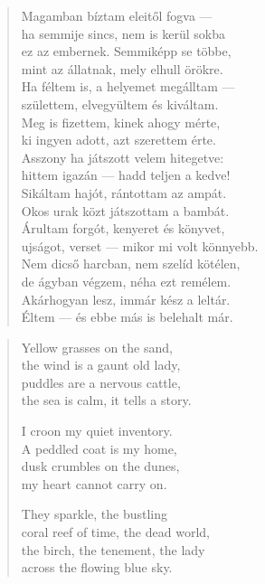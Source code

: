 \documentclass[11pt]{book}
\newcommand*{\centeredornament}{\centerline{\pgfornament[width=6cm]{88}}}
\begin{document}
\begin{verse}
  Magamban bíztam eleitől fogva --- \\
  ha semmije sincs, nem is kerül sokba \\
  ez az embernek. Semmiképp se többe, \\
  mint az állatnak, mely elhull örökre. \\
  Ha féltem is, a helyemet megálltam --- \\
  születtem, elvegyültem és kiváltam. \\
  Meg is fizettem, kinek ahogy mérte, \\
  ki ingyen adott, azt szerettem érte. \\
  Asszony ha játszott velem hitegetve: \\
  hittem igazán --- hadd teljen a kedve! \\
  Sikáltam hajót, rántottam az ampát. \\
  Okos urak közt játszottam a bambát. \\
  Árultam forgót, kenyeret és könyvet, \\
  ujságot, verset --- mikor mi volt könnyebb. \\
  Nem dicső harcban, nem szelíd kötélen, \\
  de ágyban végzem, néha ezt remélem. \\
  Akárhogyan lesz, immár kész a leltár. \\
  Éltem --- és ebbe más is belehalt már.
\end{verse}

\newpage

\vspace*{-15mm}
\centeredornament



\begin{verse}
  Yellow grasses on the sand, \\
  the wind is a gaunt old lady, \\
  puddles are a nervous cattle, \\
  the sea is calm, it tells a story.

  I croon my quiet inventory. \\
  A peddled coat is my home, \\
  dusk crumbles on the dunes, \\
  my heart cannot carry on.

  They sparkle, the bustling \\
  coral reef of time, the dead world, \\
  the birch, the tenement, the lady \\
  across the flowing blue sky.
\end{verse}
\end{document}
